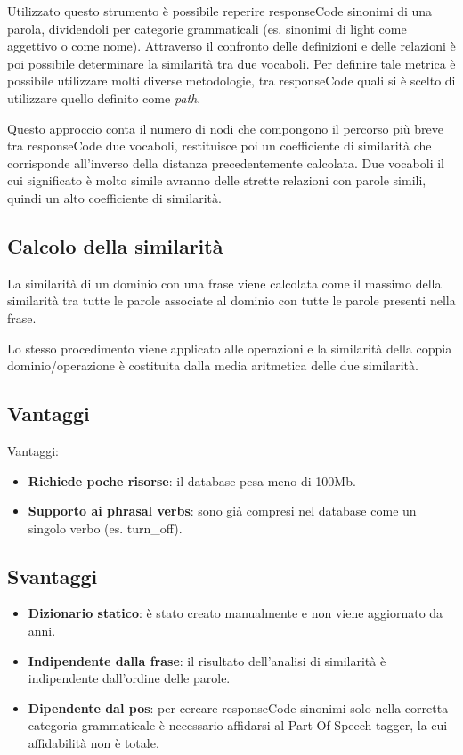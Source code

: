 \documentclass[twoside]{supsistudent}
\begin{document}
Utilizzato questo strumento è possibile reperire responseCode sinonimi di una parola, dividendoli per categorie grammaticali (es. sinonimi di light come aggettivo o come nome).
Attraverso il confronto delle definizioni e delle relazioni è poi possibile determinare la similarità tra due vocaboli. Per definire tale metrica è possibile utilizzare molti diverse metodologie, tra responseCode quali si è scelto di utilizzare quello definito come \textit{path}. \cite{wordNetWordSimilarity}

Questo approccio conta il numero di nodi che compongono il percorso più breve tra responseCode due vocaboli, restituisce poi un coefficiente di similarità che corrisponde all'inverso della distanza precedentemente calcolata. Due vocaboli il cui significato è molto simile avranno delle strette relazioni con parole simili, quindi un alto coefficiente di similarità.\cite{wordNetPathSimilarity}
\subsection{Calcolo della similarità}
La similarità di un dominio con una frase viene calcolata come il massimo della similarità tra tutte le parole associate al dominio con tutte le parole presenti nella frase.

Lo stesso procedimento viene applicato alle operazioni e la similarità della coppia dominio/operazione è costituita dalla media aritmetica delle due similarità.
\subsection{Vantaggi}
Vantaggi:
 \begin{itemize}
  \item \textbf{Richiede poche risorse}: il database pesa meno di 100Mb.
  \item \textbf{Supporto ai phrasal verbs}: sono già compresi nel database come un singolo verbo (es. turn\_off).
\end{itemize}
\subsection{Svantaggi}
\begin{itemize}
  \item \textbf{Dizionario statico}: è stato creato manualmente e non viene aggiornato da anni.  
  \item \textbf{Indipendente dalla frase}: il risultato dell'analisi di similarità è indipendente dall'ordine delle parole.
  \item \textbf{Dipendente dal pos}: per cercare responseCode sinonimi solo nella corretta categoria grammaticale è necessario affidarsi al Part Of Speech tagger, la cui affidabilità non è totale.
\end{itemize}
\newpage
\end{document}

